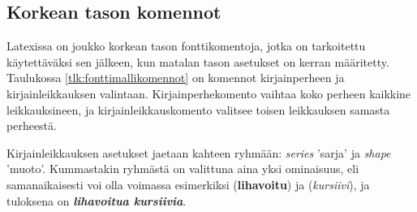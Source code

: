 \subsection{Korkean tason komennot}
\label{luku:fontit_korkea}

Latexissa on joukko korkean tason fonttikomentoja, jotka on tarkoitettu
käytettäväksi sen jälkeen, kun matalan tason asetukset on kerran
määritetty. Taulukossa \ref{tlk:fonttimallikomennot} on komennot
kirjainperheen ja kirjainleikkauksen valintaan. Kirjainperhekomento
vaihtaa koko perheen kaikkine leikkauksineen, ja kirjainleikkauskomento
valitsee toisen leikkauksen samasta perheestä.


Kirjainleikkauksen asetukset jaetaan kahteen ryhmään:
\textenglish{\emph{series}} 'sarja' ja \textenglish{\emph{shape}}
'muoto'. Kummastakin ryhmästä on valittuna aina yksi ominaisuus, eli
samanaikaisesti voi olla voimassa esimerkiksi 
(\textbf{lihavoitu}) ja  (\textit{kursiivi}), ja
tuloksena on \textbf{\itshape lihavoitua kursiivia}.

